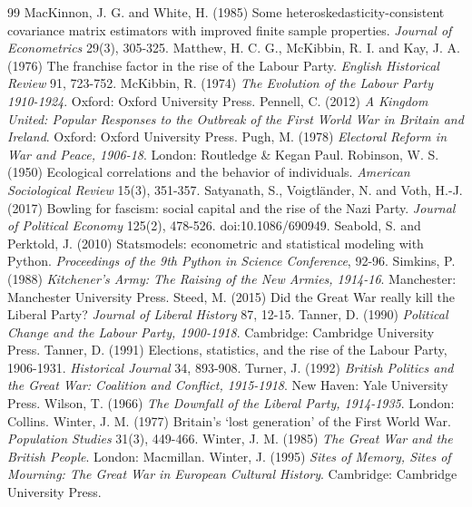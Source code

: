 \documentclass[11pt,a4paper]{article}
\begin{document}
\begin{thebibliography}{99}
 MacKinnon, J. G. and White, H. (1985) Some heteroskedasticity-consistent covariance matrix estimators with improved finite sample properties. \textit{Journal of Econometrics} 29(3), 305-325.
 Matthew, H. C. G., McKibbin, R. I. and Kay, J. A. (1976) The franchise factor in the rise of the Labour Party. \textit{English Historical Review} 91, 723-752.
 McKibbin, R. (1974) \textit{The Evolution of the Labour Party 1910-1924}. Oxford: Oxford University Press.
 Pennell, C. (2012) \textit{A Kingdom United: Popular Responses to the Outbreak of the First World War in Britain and Ireland}. Oxford: Oxford University Press.
 Pugh, M. (1978) \textit{Electoral Reform in War and Peace, 1906-18}. London: Routledge \& Kegan Paul.
 Robinson, W. S. (1950) Ecological correlations and the behavior of individuals. \textit{American Sociological Review} 15(3), 351-357.
 Satyanath, S., Voigtl\"ander, N. and Voth, H.-J. (2017) Bowling for fascism: social capital and the rise of the Nazi Party. \textit{Journal of Political Economy} 125(2), 478-526. doi:10.1086/690949.
 Seabold, S. and Perktold, J. (2010) Statsmodels: econometric and statistical modeling with Python. \textit{Proceedings of the 9th Python in Science Conference}, 92-96.
 Simkins, P. (1988) \textit{Kitchener's Army: The Raising of the New Armies, 1914-16}. Manchester: Manchester University Press.
 Steed, M. (2015) Did the Great War really kill the Liberal Party? \textit{Journal of Liberal History} 87, 12-15.
 Tanner, D. (1990) \textit{Political Change and the Labour Party, 1900-1918}. Cambridge: Cambridge University Press.
 Tanner, D. (1991) Elections, statistics, and the rise of the Labour Party, 1906-1931. \textit{Historical Journal} 34, 893-908.
 Turner, J. (1992) \textit{British Politics and the Great War: Coalition and Conflict, 1915-1918}. New Haven: Yale University Press.
 Wilson, T. (1966) \textit{The Downfall of the Liberal Party, 1914-1935}. London: Collins.
 Winter, J. M. (1977) Britain's `lost generation' of the First World War. \textit{Population Studies} 31(3), 449-466.
 Winter, J. M. (1985) \textit{The Great War and the British People}. London: Macmillan.
 Winter, J. (1995) \textit{Sites of Memory, Sites of Mourning: The Great War in European Cultural History}. Cambridge: Cambridge University Press.
\end{thebibliography}
\end{document}
